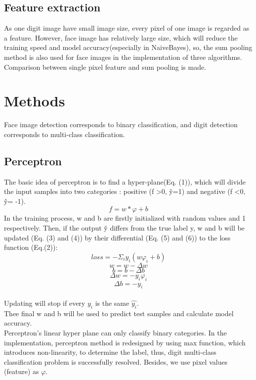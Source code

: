 \documentclass{article}
\begin{document}
\subsection{Feature extraction}
As one digit image have small image size, every pixel of one image is regarded as a feature. However, face image has relatively large size, which will reduce the training speed and model accuracy(especially in NaiveBayes), so, the sum pooling method is also used for face images in the implementation of three algorithms. Comparison between single pixel feature and sum pooling is made.

\section{Methods}
Face image detection corresponds to binary classification, and digit detection corresponds to multi-class classification.
\subsection{Perceptron}
The basic idea of perceptron is to find a hyper-plane(Eq. (1)), which will divide the input samples into two categories : positive (f \textgreater 0, \^{y}=1) and negative (f \textless 0, \^y= -1).
\begin{equation}
\label{eqn:somelabel}
f = w *\varphi + b
\end{equation}
In the training process, w and b are firstly initialized with random values and 1 respectively. Then, if the output \^{y} differs from the true label y, w and b will be updated (Eq. (3) and (4)) by their differential (Eq. (5) and (6)) to the loss function (Eq.(2)):
\begin{equation}
\label{eqn:somelabel}
loss = -\Sigma_i y_i(w\varphi_i +b)
\end{equation}
\begin{equation}
\label{eqn:somelabel}
w = w - \Delta w
\end{equation}
\begin{equation}
\label{eqn:somelabel}
b = b - \Delta b
\end{equation}
\begin{equation}
\label{eqn:somelabel}
\Delta w = -y_i\varphi_i
\end{equation}
\begin{equation}
\label{eqn:somelabel}
\Delta b = -y_i
\end{equation}
\\Updating will stop if every $y_i$ is the same $\hat{y_i}$.
\\Thee final w and b will be used to predict test samples and calculate model accuracy.
\\Perceptron’s linear hyper plane can only classify binary categories. In the implementation, perceptron method is redesigned by using max function, which introduces non-linearity, to determine the label, thus, digit multi-class classification problem is successfully resolved.
Besides, we use pixel values (feature) as $\varphi$.
\end{document}
